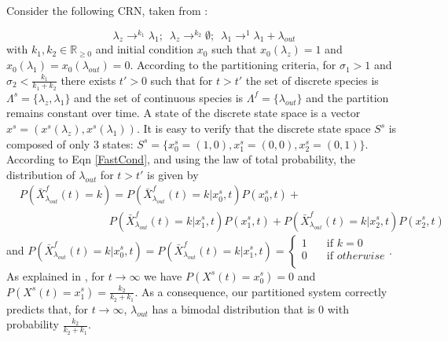 \documentclass{llncs}
\begin{document}
\begin{example}\label{multimodal}
Consider the following CRN, taken from \cite{cardelliprogramming}:

\[ \lambda_z \rightarrow^{k_1} \lambda_1;\,\,\,\lambda_{z}\rightarrow^{k_2}\emptyset;\,\,\, \lambda_1 \rightarrow^{1}\lambda_1+\lambda_{out}  \]
with $k_1,k_2 \in \mathbb{R}_{\geq 0}$ and initial condition $x_0$ such that $x_0(\lambda_z)=1$ and $x_0(\lambda_1)=x_0(\lambda_{out})=0$. According to the partitioning criteria, %
for $\sigma_{1}>1$ and $\sigma_2<\frac{k_1}{k_1+k_2}$ there exists $t'>0$ such that for $t>t'$ the set of discrete species is $\Lambda^s=\{\lambda_z,\lambda_1 \}$ and the set of continuous species is $\Lambda^{f}=\{\lambda_{out}\}$ and the partition remains constant over time.
A state of the discrete state space is a vector $x^s=(x^s(\lambda_z),x^s(\lambda_1))$. It is easy to verify that the discrete state space $S^s$ is composed of only $3$ states: $S^s=\{x^s_0=(1,0),x^s_1=(0,0),x^s_2=(0,1)\}$.
According to Eqn \eqref{FastCond}, and using the law of total probability, the distribution of $\lambda_{out}$ for $t>t'$ is given by \begin{equation*}\label{MultiEx}
\begin{split}
&P(\bar{X}^f_{\lambda_{out}}(t)=k)=P(\bar{X}^f_{\lambda_{out}}(t)=k|x^s_0,t)P(x^s_0,t)+
\\& \,\,\,\,\,\,\,\,\,\,\,\,\,\,\,\,\,\,\,\,\,\,\,\,\,\,\,\,\,\,\,\,\,\,\,\,\,\,\,\,\,\,\,\,\,\,\,\,\,P(\bar{X}^f_{\lambda_{out}}(t)=k|x^s_1,t)P(x^s_1,t)+P(\bar{X}^f_{\lambda_{out}}(t)=k|x^s_2,t)P(x^s_2,t)
\end{split}
\end{equation*}
and $P(\bar{X}^f_{\lambda_{out}}(t)=k|x^s_0,t)=P(\bar{X}^f_{\lambda_{out}}(t)=k|x^s_1,t)=\begin{cases}
    1       & \quad \text{if $k=0$}\\
    0       & \quad \text{if $otherwise$}\\
  \end{cases}$.
  As explained in \cite{cardelliprogramming}, for $t \rightarrow \infty$ we have $P(X^s(t)=x^s_0)=0$ and $P(X^s(t)=x^s_1)=\frac{k_2}{k_2+k_1}$. As a consequence, our partitioned system correctly predicts that, for $t\rightarrow \infty$, $\lambda_{out}$ has a bimodal distribution that is $0$ with probability $\frac{k_2}{k_2+k_1}$.
\end{example}
\end{document}
